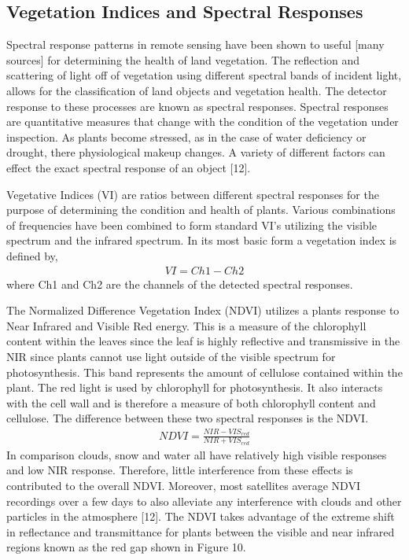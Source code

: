 \subsection{Vegetation Indices and Spectral Responses}
Spectral response patterns in remote sensing have been shown to useful [many sources] for determining the health of land vegetation.  The reflection and scattering of light off of vegetation using different spectral bands of incident light, allows for the classification of land objects and vegetation health.  The detector response to these processes are known as spectral responses.  Spectral responses are quantitative measures that change with the condition of the vegetation under inspection.  As plants become stressed, as in the case of water deficiency or drought, there physiological makeup changes.  A variety of different factors can effect the exact spectral response of an object [12].

Vegetative Indices (VI) are ratios between different spectral responses for the purpose of determining the condition and health of plants.  Various combinations of frequencies have been combined to form standard VI’s utilizing the visible spectrum and the infrared spectrum. In its most basic form a vegetation index is defined by,
%
\begin{align}
    VI = Ch1 - Ch2
\end{align}
%
where Ch1 and Ch2 are the channels of the detected spectral responses.

The Normalized Difference Vegetation Index (NDVI) utilizes a plants response to Near Infrared and Visible Red energy.  This is a measure of the chlorophyll content within the leaves since the leaf is highly reflective and transmissive in the NIR since plants cannot use light outside of the visible spectrum for photosynthesis.  This band represents the amount of cellulose contained within the plant.  The red light is used by chlorophyll for photosynthesis.  It also interacts with the cell wall and is therefore a measure of both chlorophyll content and cellulose.  The difference between these two spectral responses is the NDVI.
%
\begin{align}
    NDVI = \frac{NIR - VIS_{red}}{NIR + VIS_{red}}
\end{align}
%
In comparison clouds, snow and water all have relatively high visible responses and low NIR response.  Therefore, little interference from these effects is contributed to the overall NDVI.  Moreover, most satellites average NDVI recordings over a few days to also alleviate any interference with clouds and other particles in the atmosphere [12].
The NDVI takes advantage of the extreme shift in reflectance and transmittance for plants between the visible and near infrared regions known as the red gap shown in Figure 10.

